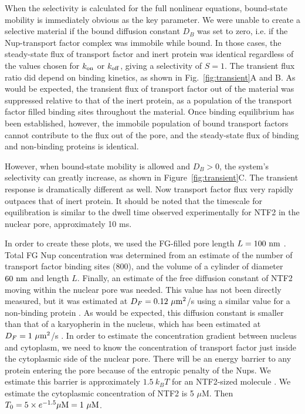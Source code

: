 When the selectivity is calculated for the full nonlinear equations, bound-state mobility is immediately obvious as the key parameter.  We were unable to create a selective material if the bound diffusion constant $D_B$ was set to zero, i.e. if the Nup-transport factor complex was immobile while bound.  In those cases, the steady-state flux of transport factor and inert protein was identical regardless of the values chosen for $k_{\rm on}$ or $k_{\rm off}$, giving a selectivity of $S = 1$.  The transient flux ratio did depend on binding kinetics, as shown in Fig.~\ref{fig:transient}A and B.  As would be expected, the transient flux of transport factor out of the material was suppressed relative to that of the inert protein, as a population of the transport factor filled binding sites throughout the material.  Once binding equilibrium has been established, however, the immobile population of bound transport factors cannot contribute to the flux out of the pore, and the steady-state flux of binding and non-binding proteins is identical.

However, when bound-state mobility is allowed and $D_B > 0$, the system's selectivity can greatly increase, as shown in Figure~\ref{fig:transient}C.  The transient response is dramatically different as well.  Now transport factor flux very rapidly outpaces that of inert protein.  It should be noted that the timescale for equilibration is similar to the dwell time observed experimentally for NTF2 in the nuclear pore, approximately 10 ms.

In order to create these plots, we used the FG-filled pore length $L = 100\ {\rm nm}$
\cite{frenkiel-krispin10, maimon12}.  Total FG Nup concentration was determined from an estimate of the number of transport factor binding sites (800), and the volume of a cylinder of diameter $60\ {\rm nm}$ and length $L$.  Finally, an estimate of the free diffusion constant of NTF2 moving within the nuclear pore was needed.  This value has not been directly measured, but it was estimated at $D_F = 0.12 \ \mu\mathrm{m}^2$/s using a similar value for a non-binding protein \cite{ribbeck01}.  As would be expected, this diffusion constant is smaller than that of a karyopherin in the nucleus, which has been estimated at $D_F =1 \ \mu\mathrm{m}^2$/s \cite{cardarelli10}.  In order to estimate the concentration gradient between nucleus and cytoplasm, we need to know the concentration of transport factor just inside the cytoplasmic side of the nuclear pore.  There will be an energy barrier to any protein entering the pore because of the entropic penalty of the Nups.  We estimate this barrier is approximately $1.5\ k_B T$ for an NTF2-sized molecule \cite{timney16}.  We estimate the cytoplasmic concentration of NTF2 is 5 $\mu$M.  Then $T_0= 5 \times e^{-1.5} \mu \mathrm{M} = 1 \mathrm{\ \mu M}$.  

